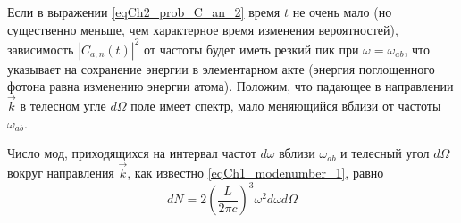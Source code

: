 Если в выражении \eqref{eqCh2_prob_C_an_2} время $t$ не очень мало (но
существенно меньше, чем характерное время изменения вероятностей),
зависимость $\left|C_{a,n}\left(t\right)\right|^2$ от частоты будет
иметь резкий пик при $\omega = \omega_{ab}$,  что указывает на
сохранение энергии в элементарном акте (энергия поглощенного фотона
равна изменению энергии атома). Положим, что падающее в направлении
$\vec{k}$ в телесном угле $d \Omega$ поле имеет спектр, мало
меняющийся вблизи от частоты $\omega_{ab}$. 
 
Число мод, приходящихся на интервал частот $d \omega$  вблизи
$\omega_{ab}$ и телесный угол $d \Omega$  вокруг направления
$\vec{k}$,  как известно \eqref{eqCh1_modenumber_1}, равно
\begin{equation}
d N = 2 \left(\frac{L}{2 \pi c} \right)^3 \omega^2 d \omega d \Omega
\end{equation}

